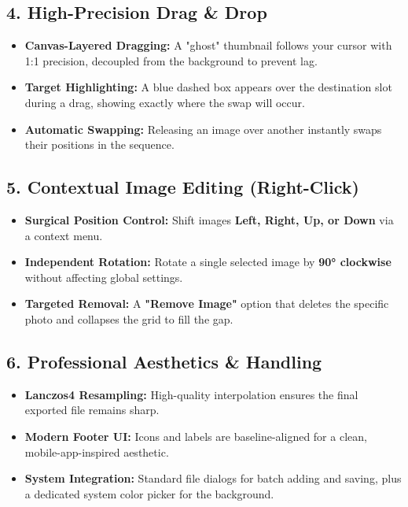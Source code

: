 \documentclass[a4paper]{article}
\begin{document}
\subsection*{4. High-Precision Drag \& Drop}
\begin{itemize}
    \item \textbf{Canvas-Layered Dragging:} A "ghost" thumbnail follows your cursor with 1:1 precision, decoupled from the background to prevent lag.
    \item \textbf{Target Highlighting:} A blue dashed box appears over the destination slot during a drag, showing exactly where the swap will occur.
    \item \textbf{Automatic Swapping:} Releasing an image over another instantly swaps their positions in the sequence.
\end{itemize}

\subsection*{5. Contextual Image Editing (Right-Click)}
\begin{itemize}
    \item \textbf{Surgical Position Control:} Shift images \textbf{Left, Right, Up, or Down} via a context menu.
    \item \textbf{Independent Rotation:} Rotate a single selected image by \textbf{90° clockwise} without affecting global settings.
    \item \textbf{Targeted Removal:} A \textbf{"Remove Image"} option that deletes the specific photo and collapses the grid to fill the gap.
\end{itemize}

\subsection*{6. Professional Aesthetics \& Handling}
\begin{itemize}
    \item \textbf{Lanczos4 Resampling:} High-quality interpolation ensures the final exported file remains sharp.
    \item \textbf{Modern Footer UI:} Icons and labels are baseline-aligned for a clean, mobile-app-inspired aesthetic.
    \item \textbf{System Integration:} Standard file dialogs for batch adding and saving, plus a dedicated system color picker for the background.
\end{itemize}
\end{document}
